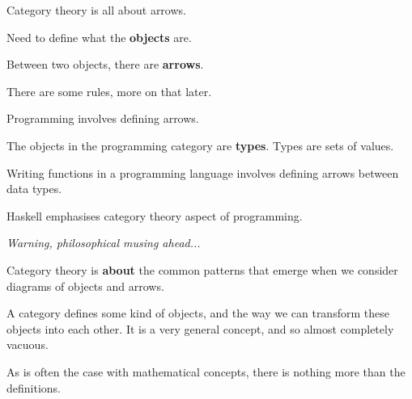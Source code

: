 \documentclass[xcolor={table}]{beamer}
\begin{document}
\begin{frame}{}{}

    \centering


\end{frame}

\begin{frame}{}{}

    {\Large Category theory is all about arrows. }

    \pause\bigskip
    Need to define what the \textbf{objects} are.

    \pause\bigskip
    Between two objects, there are \textbf{arrows}. 

    \pause\bigskip
    There are some rules, more on that later.

\end{frame}

\begin{frame}{}{}

    {\Large Programming involves defining arrows.}

    \pause\bigskip
    The objects in the programming category are \textbf{types}. Types are sets of values.

    \pause\bigskip
    Writing functions in a programming language involves defining arrows between data types. 

    \pause\bigskip
    Haskell emphasises category theory aspect of programming.

\end{frame}

\begin{frame}{}{}

    \emph{Warning, philosophical musing ahead...}

    \pause\bigskip
    Category theory is \textbf{about} the common patterns that emerge when we consider diagrams of objects and arrows.

    \pause\bigskip
    A category defines some kind of objects, and the way we can transform these objects into each other. It is a very general concept, and so almost completely vacuous.

    \pause\bigskip
    As is often the case with mathematical concepts, there is nothing more than the definitions.

\end{frame}
\end{document}
